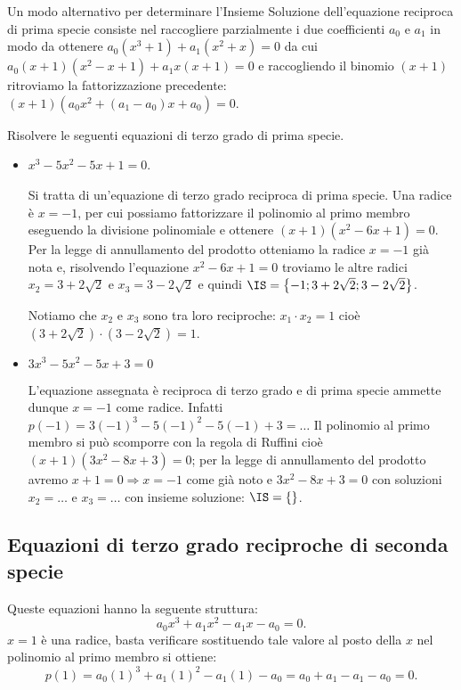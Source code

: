 Un modo alternativo per determinare l’Insieme Soluzione dell’equazione reciproca di prima specie consiste nel raccogliere parzialmente i due coefficienti $a_0$ e $a_1$ in modo da ottenere $a_0\left(x^3+1\right)+a_1\left(x^2+x\right)=0$ da cui $a_0(x+1)\left(x^2-x+1\right)+a_1x(x+1)=0$ e raccogliendo il binomio $(x+1)$ ritroviamo la fattorizzazione precedente: $(x+1) \left(a_0x^2+(a_1-a_0)x+a_0\right)=0$.
\begin{exrig}
 \begin{esempio}
 Risolvere le seguenti equazioni di terzo grado di prima specie.

 \begin{itemize}
 \item $x^3-5x^2-5x+1=0$.

 Si tratta di un’equazione di terzo grado reciproca di prima specie. Una radice è $x=-1$, per cui possiamo fattorizzare il polinomio al primo membro eseguendo la divisione polinomiale e ottenere $(x+1)\left(x^2-6x+1\right)=0$. Per la legge di annullamento del prodotto otteniamo la radice $x=-1$ già nota e, risolvendo l’equazione $x^2-6x+1=0$ troviamo le altre radici $x_2=3+2\sqrt 2$ e $x_3=3-2\sqrt 2$ e quindi $\IS=\left\{-1;3+2\sqrt 2;3-2\sqrt 2\right\}$.

 Notiamo che $ x_2 $ e $ x_3 $ sono tra loro reciproche: $ x_1 \cdot x_2=1 $ cioè $ (3+2\sqrt 2)\cdot (3-2\sqrt 2)=1 $.

 \item $3x^3-5x^2-5x+3=0$

 L’equazione assegnata è reciproca di terzo grado e di prima specie ammette dunque $x=-1$ come radice. Infatti $p(-1)=3(-1)^3-5(-1)^2-5(-1)+3=\ldots$ Il polinomio al primo membro si può scomporre con la regola di Ruffini cioè $(x+1)\left(3x^2-8x+3\right)=0$; per la legge di annullamento del prodotto avremo $x+1=0\Rightarrow x=-1$ come già noto e $3x^2-8x+3=0$ con soluzioni $x_2=\ldots $ e $x_3=\ldots $ con insieme soluzione: $\IS=\{\dotfill \}$.
 \end{itemize}
 \end{esempio}
\end{exrig}
\ovalbox{\risolvii \ref{ese:5.38},\ref{ese:5.39},\ref{ese:5.40}, \ref{ese:5.41}}

\subsection{Equazioni di terzo grado reciproche di seconda specie}
Queste equazioni hanno la seguente struttura:
\[a_0x^3+a_1x^2-a_1x-a_0=0.\]
$x=1$ è una radice, basta verificare sostituendo tale valore al posto della $ x $ nel polinomio al primo membro si ottiene: \[p(1)=a_0(1)^3+a_1(1)^2-a_1(1)-a_0=a_0+a_1-a_1-a_0=0.\]

